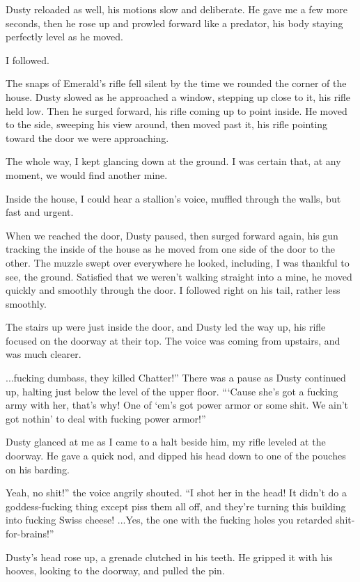 Dusty reloaded as well, his motions slow and deliberate. He gave me a few more seconds, then he rose up and prowled forward like a predator, his body staying perfectly level as he moved.

I followed.

The snaps of Emerald’s rifle fell silent by the time we rounded the corner of the house. Dusty slowed as he approached a window, stepping up close to it, his rifle held low. Then he surged forward, his rifle coming up to point inside. He moved to the side, sweeping his view around, then moved past it, his rifle pointing toward the door we were approaching.

The whole way, I kept glancing down at the ground. I was certain that, at any moment, we would find another mine.

Inside the house, I could hear a stallion’s voice, muffled through the walls, but fast and urgent.

When we reached the door, Dusty paused, then surged forward again, his gun tracking the inside of the house as he moved from one side of the door to the other. The muzzle swept over everywhere he looked, including, I was thankful to see, the ground. Satisfied that we weren’t walking straight into a mine, he moved quickly and smoothly through the door. I followed right on his tail, rather less smoothly.

The stairs up were just inside the door, and Dusty led the way up, his rifle focused on the doorway at their top. The voice was coming from upstairs, and was much clearer.

\leavevmode{}...fucking dumbass, they killed Chatter!” There was a pause as Dusty continued up, halting just below the level of the upper floor. “‘Cause she’s got a fucking army with her, that’s why! One of ‘em’s got power armor or some shit. We ain’t got nothin’ to deal with fucking power armor!”

Dusty glanced at me as I came to a halt beside him, my rifle leveled at the doorway. He gave a quick nod, and dipped his head down to one of the pouches on his barding.

\leavevmode{}Yeah, no shit!” the voice angrily shouted. “I shot her in the head! It didn’t do a goddess-fucking thing except piss them all off, and they’re turning this building into fucking Swiss cheese! ...Yes, the one with the fucking holes you retarded shit-for-brains!”

Dusty’s head rose up, a grenade clutched in his teeth. He gripped it with his hooves, looking to the doorway, and pulled the pin.

